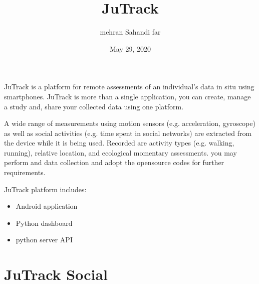\documentclass[letterpaper,10pt,english]{sphinxmanual}
\title{JuTrack}
\date{May 29, 2020}
\author{mehran Sahandi far}
\begin{document}
\pagestyle{empty}
\sphinxmaketitle
\pagestyle{plain}
\sphinxtableofcontents
\pagestyle{normal}
\label{\detokenize{index::doc}}


JuTrack is a platform for remote assessments of an individual’s data in situ using smartphones.
JuTrack is more than a single application, you can create, manage a study and, share your collected data using one platform.

A wide range of measurements using motion sensors (e.g. acceleration, gyroscope) as well as social activities (e.g. time spent in social networks) are extracted from the device while it is being used. Recorded are activity types (e.g. walking, running), relative location, and ecological momentary assessments.
you may perform  and  data collection and adopt the open\sphinxhyphen{}source codes for further requirements.

JuTrack platform includes:
\begin{itemize}
\item {} 
Android application

\item {} 
Python dashboard

\item {} 
python server API

\end{itemize}

\begin{DUlineblock}{0em}
\item[] 
\item[] 
\end{DUlineblock}


\begin{DUlineblock}{0em}
\item[] 
\item[] 
\end{DUlineblock}


\chapter{JuTrack Social}
\label{\detokenize{JuTrack_Social:jutrack-social}}\label{\detokenize{JuTrack_Social::doc}}
\end{document}
